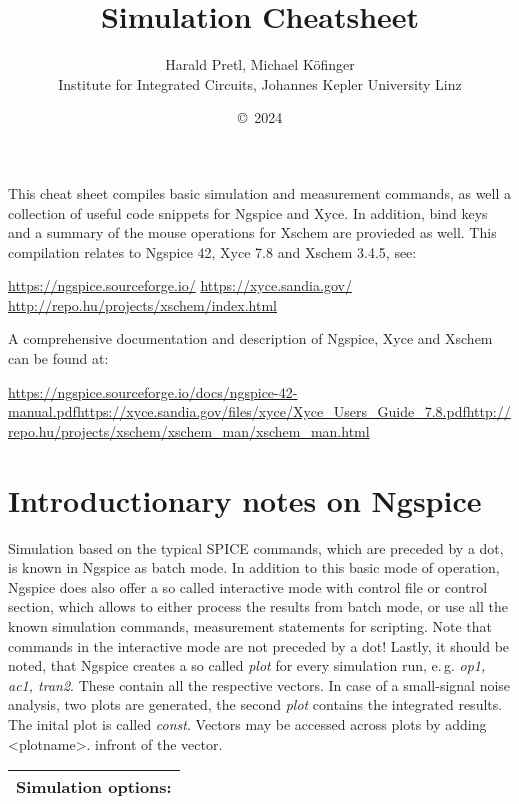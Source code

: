 \documentclass[10pt,a4paper]{article}
\author{Harald Pretl, Michael Köfinger\\Institute for Integrated Circuits, Johannes Kepler University Linz}
\title{Simulation Cheatsheet}
\date{\copyright~2024}
\begin{document}
	\maketitle
	
	This cheat sheet compiles basic simulation and measurement commands, as well a collection of useful code snippets for Ngspice and Xyce. In addition, bind keys and a summary of the mouse operations for Xschem are provieded as well. This compilation relates to Ngspice  42, Xyce 7.8 and Xschem 3.4.5, see:
	
	\url{https://ngspice.sourceforge.io/}\newline
	\url{https://xyce.sandia.gov/}\newline
	\url{http://repo.hu/projects/xschem/index.html}
	
	A comprehensive documentation and description of Ngspice, Xyce and Xschem can be found at:
	
	\url{https://ngspice.sourceforge.io/docs/ngspice-42-manual.pdf}\newline \url{https://xyce.sandia.gov/files/xyce/Xyce_Users_Guide_7.8.pdf}\newline \url{http://repo.hu/projects/xschem/xschem_man/xschem_man.html}
	
	\newpage
	
		\section*{Introductionary notes on Ngspice}
	Simulation based on the typical SPICE commands, which are preceded by a dot, is known in Ngspice as batch mode. In addition to this basic mode of operation, Ngspice does also offer a so called interactive mode with control file or control section, which allows to either process the results from batch mode, or use all the known simulation commands, measurement statements for scripting. Note that commands in the interactive mode are not preceded by a dot!
	Lastly, it should be noted, that Ngspice creates a so called \emph{plot} for every simulation run, e.\,g. \emph{op1, ac1, tran2}. These contain all the respective vectors. In case of a small-signal noise analysis, two plots are generated, the second \emph{plot} contains the integrated results. The inital plot is called \emph{const}. Vectors may be accessed across plots by adding <plotname>. infront of the vector.
	
	\begin{tabular}{p{}p{}}
		\toprule
		\multicolumn{2}{l}{Simulation options:}\\
		\midrule
		
		\bottomrule
	\end{tabular}
	
\end{document}
